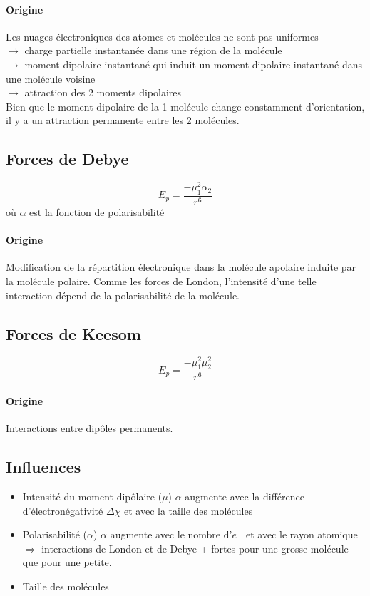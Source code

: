 \documentclass[11pt,a4paper,french]{article}
\begin{document}
\paragraph{Origine}
Les nuages électroniques des atomes et molécules ne sont pas uniformes\\ $\rightarrow$ charge partielle instantanée dans une région de la molécule\\ $\rightarrow$ moment dipolaire instantané qui induit un moment dipolaire instantané dans une molécule voisine\\ $\rightarrow$ attraction des 2 moments dipolaires\\
Bien que le moment dipolaire de la 1 molécule change constamment d'orientation, il y a un attraction permanente entre les 2 molécules.

\subsection{Forces de Debye}
\[ E_p = \frac{-\mu_1^2 \alpha_2}{r^6} \]
où $\alpha$ est la fonction de polarisabilité

\paragraph{Origine}
Modification de la répartition électronique dans la molécule apolaire induite par la molécule polaire.
Comme les forces de London, l'intensité d'une telle interaction dépend de la polarisabilité de la molécule.

\subsection{Forces de Keesom}
\[ E_p = \frac{-\mu_1^2 \mu_2^2}{r^6} \]

\paragraph{Origine}
Interactions entre dipôles permanents.

\subsection{Influences}

\begin{itemize}
	\item Intensité du moment dipôlaire ($\mu$)
		$\alpha$ augmente avec la différence d'électronégativité $\Delta\chi$ et avec la taille des molécules\\
	\item Polarisabilité ($\alpha$)
		$\alpha$ augmente avec le nombre d'$e^-$ et avec le rayon atomique\\
		$\Rightarrow$ interactions de London et de Debye + fortes pour une grosse molécule que pour une petite.
	\item Taille des molécules %
\end{itemize}
\end{document}
